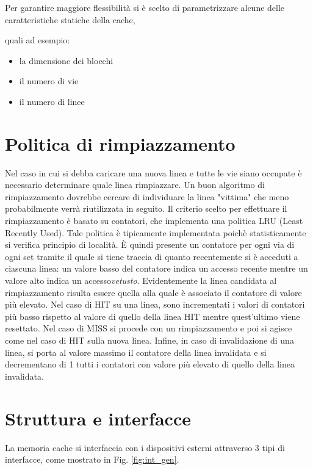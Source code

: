 Per garantire maggiore flessibilit\`a si \`e scelto di parametrizzare alcune delle caratteristiche statiche della cache,

quali ad esempio:
\begin{itemize}
\item la dimensione dei blocchi
\item il numero di vie
\item il numero di linee
\end{itemize}


\section{Politica di rimpiazzamento}

Nel caso in cui si debba caricare una nuova linea e tutte le vie siano occupate \`e necessario determinare quale linea rimpiazzare.
Un buon algoritmo di rimpiazzamento dovrebbe cercare di individuare la linea "vittima" che meno probabilmente verr\`a riutilizzata in seguito.
Il criterio scelto per effettuare il rimpiazzamento \`e basato su contatori, che implementa una politica LRU (Least Recently Used).
Tale politica \`e tipicamente implementata poich\`e statisticamente si verifica principio di localit\`a.
\`E quindi presente un contatore per ogni via di ogni set tramite il quale si tiene traccia di quanto recentemente si \`e acceduti a ciascuna linea: un valore basso del contatore indica un accesso recente mentre un valore alto indica un accesso\emph{vetusto}.
Evidentemente la linea candidata al rimpiazzamento risulta essere quella alla quale \`e associato il contatore di valore pi\`u elevato.
Nel caso di HIT su una linea, sono incrementati i valori di contatori pi\`u basso rispetto al valore di quello della linea HIT mentre quest'ultimo viene resettato.
Nel caso di MISS si procede con un rimpiazzamento e poi si agisce come nel caso di HIT sulla nuova linea.
Infine, in caso di invalidazione di una linea, si porta al valore massimo il contatore della linea invalidata e si decrementano di 1 tutti i contatori con valore pi\`u elevato di quello della linea invalidata.


\section{Struttura e interfacce}
La memoria cache si interfaccia con i dispositivi esterni attraverso 3 tipi di interfacce, come mostrato in Fig. \ref{fig:int_gen}.

